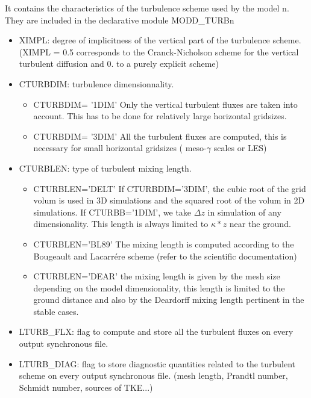It contains the characteristics of the turbulence scheme used by the model n. They are
included in the declarative module MODD\_TURBn
\begin{itemize}
\item
{}
XIMPL: degree of implicitness of the vertical part of the turbulence scheme.
(XIMPL = 0.5 corresponds to the Cranck-Nicholson scheme for the vertical
turbulent diffusion and  0. to a purely explicit scheme)
\item
{}
CTURBDIM: turbulence dimensionnality. 
\begin{itemize}
\item
CTURBDIM= '1DIM'  Only the vertical turbulent fluxes are taken
into account. This has to be done for relatively large horizontal gridsizes.
\item
CTURBDIM= '3DIM'  All the turbulent fluxes are computed, this is necessary for
small horizontal gridsizes ( meso-$\gamma$ scales or LES)
\end{itemize}

\item
{}
CTURBLEN: type of turbulent mixing length.
\begin{itemize}
\item
CTURBLEN='DELT' If CTURBDIM='3DIM', the cubic root of the grid volum is used
 in 3D simulations and  the squared root of the volum in 2D simulations.
If CTURBB='1DIM', we take 
$\Delta z $ in simulation of any dimensionality. 
This length is always limited to $\kappa * z$  near the ground.
\item
CTURBLEN='BL89'
The mixing length is computed according to the Bougeault and Lacarr\'ere scheme
(refer to the scientific documentation)
\item
CTURBLEN='DEAR'
the mixing length is given by the mesh size depending on the model
dimensionality, this length is limited to the ground distance and
also by the Deardorff mixing length pertinent in the stable cases.
\end{itemize}

\item
{}
LTURB\_FLX: flag to compute and store all the turbulent fluxes
 on every output synchronous file.

\item
{}
LTURB\_DIAG: flag to  store diagnostic quantities related to the 
turbulent scheme  on every output synchronous file. (mesh length, Prandtl
number, Schmidt number, sources of TKE...)


\end{itemize}
